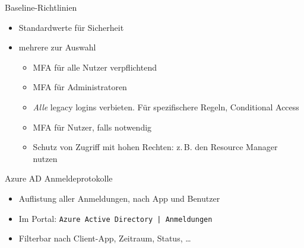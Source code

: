 \begin{flashcard}[Definition]{Baseline-Richtlinien}
    \begin{itemize}
        \item Standardwerte für Sicherheit
        \item mehrere zur Auswahl
            \begin{itemize}
                \item MFA für alle Nutzer verpflichtend
                \item MFA für Administratoren
                \item \emph{Alle} legacy logins verbieten. Für spezifischere Regeln, Conditional Access
                \item MFA für Nutzer, falls notwendig
                \item Schutz von Zugriff mit hohen Rechten: z.\,B. den Resource Manager nutzen
            \end{itemize}

    \end{itemize}
\end{flashcard}



\begin{flashcard}[Definition]{Azure AD Anmeldeprotokolle}
    \begin{itemize}
        \item Auflistung aller Anmeldungen, nach App und Benutzer
        \item Im Portal: \newline
            \texttt{Azure Active Directory | Anmeldungen}
        \item Filterbar nach Client-App, Zeitraum, Status, \ldots
    \end{itemize}
\end{flashcard}

